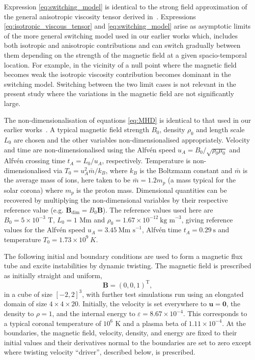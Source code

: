 \documentclass[fleqn,usenatbib]{mnras}
\renewcommand{\vec}[1]{{\bm #1}}
\begin{document}
Expression \eqref{eq:switching_model} is identical to the strong field approximation of the
general anisotropic viscosity tensor derived in~\citet{braginskiiTransportProcessesPlasma1965}.
Expressions \eqref{eq:isotropic_viscous_tensor} and \eqref{eq:switching_model} arise as asymptotic limits of the
more general switching model used in our earlier works 
\citep{mactaggartBraginskiiMagnetohydrodynamicsArbitrary2017,quinnEffectAnisotropicViscosity2020,quinnKelvinHelmholtzInstabilityCollapse2021}
which, includes both isotropic and anisotropic contributions and can
switch gradually between them depending on the strength of the
magnetic field at a given spacio-temporal location. For example, in
the vicinity of a null point where the magnetic field becomes weak the
isotropic viscosity contribution becomes dominant in the switching
model. Switching between the two limit cases is not relevant in the
present study where the variations in the magnetic field are not
significantly large.

The non-dimensionalisation of equations \eqref{eq:MHD} is identical to that used in
our earlier works~\citep{quinnEffectAnisotropicViscosity2020,quinnKelvinHelmholtzInstabilityCollapse2021}. A typical magnetic
field strength $B_0$, density $\rho_0$ and length scale $L_0$ are
chosen and the other variables non-dimensionalised
appropriately. Velocity and time are non-dimensionalised using the
Alfv\'en speed $u_A = B_0 / \sqrt{\rho_0 \mu_0}$ and Alfv\'en crossing 
time $t_A = L_0/u_A$, respectively. Temperature is non-dimensionalised
via $T_0 = u_A^2 \bar{m} / k_B$, where $k_B$ is the Boltzmann constant
and $\bar{m}$ is the average mass of ions, here taken to be $\bar{m} =
1.2m_p$ (a mass typical for the solar corona) where $m_p$ is the
proton mass. Dimensional quantities can be recovered by multiplying
the non-dimensional variables by their respective reference value
(e.g. $\vec{B}_{\dim} = B_0 \vec{B}$). The reference values used here
are $B_0 = 5 \times 10^{-3}$ T, $L_0 = 1$ Mm and $\rho_0 = 1.67 \times
10^{-12} \ \text{kg m}^{-3}$, giving reference values for the Alfv\'en
speed $u_A = 3.45\ \text{Mm s}^{-1}$, Alfv\'en time $t_A =
0.29\ \text{s}$ and temperature $T_0 = 1.73 \times 10^{9}\ K$.      

The following initial and boundary conditions are used to form a
magnetic flux tube and excite instabilities by dynamic twisting. 
The magnetic field is prescribed as initially straight and uniform,
\begin{equation}
\vec{B} = (0, 0, 1)^{\text{T}},
\end{equation}
in a cube of size $[-2,2]^3$, with further test simulations run using an elongated domain of size $4\times4\times20$. Initially, the velocity is set
everywhere to $\vec{u} = \vec{0}$, the density to $\rho = 1$,
and the
internal energy to $\varepsilon = 8.67\times 10^{-4}$. This corresponds
to a typical coronal temperature of $10^6$ K and a plasma beta of $1.11 \times 10^{-4}$. At the
boundaries, the magnetic field, velocity, density, and energy are fixed to their
initial values and their derivatives normal to the
boundaries are set to zero  except
where twisting velocity ``driver'', described
below, is prescribed.
\end{document}
